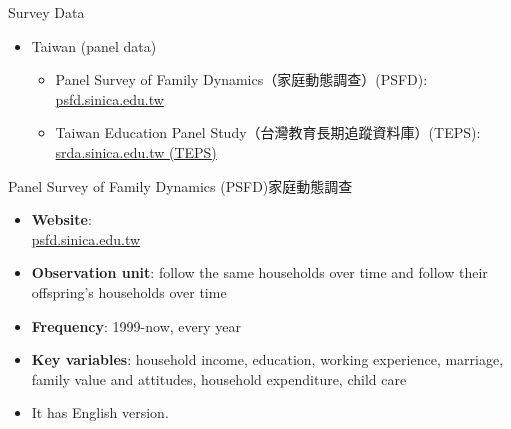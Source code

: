 \documentclass[hyperref={pdfpagelabels=false}]{beamer}
\begin{document}
\begin{frame}{Survey Data}
	\begin{itemize} 
		\item Taiwan (panel data)
		\vspace{0.3cm}
		\begin{itemize} 
			\item Panel Survey of Family Dynamics（家庭動態調查）(PSFD): \href{https://psfd.sinica.edu.tw/V2/?page_id=966&lang=en}{psfd.sinica.edu.tw}
			\vspace{0.3cm}
			\item Taiwan Education Panel Study（台灣教育長期追蹤資料庫）(TEPS): \href{https://srda.sinica.edu.tw/browsingbydatatype_result.php?category=surveymethod\&type=2\&csid=7}{srda.sinica.edu.tw (TEPS)}
			
			
		\end{itemize}
		
	\end{itemize}
\end{frame}



\begin{frame}{Panel Survey of Family Dynamics (PSFD)}{家庭動態調查}
	\begin{itemize} 
		\item \textbf{Website}: \\ \href{https://psfd.sinica.edu.tw/V2/?page_id=966&lang=en}{psfd.sinica.edu.tw}
		\vspace{0.2cm}
		\item \textbf{Observation unit}: follow the same households over time and follow their offspring's households over time
		\vspace{0.2cm}
		\item \textbf{Frequency}: 1999-now, every year 
		\vspace{0.2cm}
		\item \textbf{Key variables}: household income, education, working experience, marriage, family value and attitudes, household expenditure, child care
		\vspace{0.2cm}
		\item It has English version. 
		
		
	\end{itemize}
\end{frame}
\end{document}
